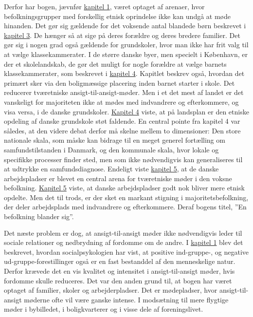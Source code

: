 \documentclass[
]{book}
\begin{document}
Derfor har bogen, jævnfør \hyperref[kap1]{kapitel 1}, været optaget af arenaer, hvor befolkningsgrupper med forskellig etnisk oprindelse ikke kan undgå at møde hinanden. Det gør sig gældende for det voksende antal blandede børn beskrevet i \hyperref[kap3]{kapitel 3}. De hænger så at sige på deres forældre og deres bredere familier. Det gør sig i nogen grad også gældende for grundskoler, hvor man ikke har frit valg til at vælge klassekammerater. I de større danske byer, men specielt i København, er der et skolelandskab, de gør det muligt for nogle forældre at vælge barnets klassekammerater, som beskrevet i \hyperref[kap4]{kapitel 4}. Kapitlet beskrev også, hvordan det primært sker via den boligmæssige placering inden barnet starter i skole. Det reducerer tværetniske ansigt-til-ansigt-møder. Men i et det mest af landet er det vanskeligt for majoriteten ikke at mødes med indvandrere og efterkommere, og visa versa, i de danske grundskoler. \hyperref[kap4]{Kapitel 4} viste, at på landsplan er den etniske opdeling af danske grundskole støt faldende. En central pointe fra kapitel 4 var således, at den videre debat derfor må skelne mellem to dimensioner: Den store nationale skala, som måske kan bidrage til en meget generel fortælling om samfundstilstanden i Danmark, og den kommunale skala, hvor lokale og specifikke processer finder sted, men som ikke nødvendigvis kan generaliseres til at udtrykke en samfundsdiagnose. Endeligt viste \hyperref[kap5]{kapitel 5}, at de danske arbejdspladser er blevet en central arena for tværetniske møder i den voksne befolkning. \href{kap5}{Kapitel 5} viste, at danske arbejdspladser godt nok bliver mere etnisk opdelte. Men det til trods, er der sket en markant stigning i majoritetsbefolkning, der deler arbejdsplads med indvandrere og efterkommere. Deraf bogens titel, ''En befolkning blander sig''.

Det næste problem er dog, at ansigt-til-ansigt møder ikke nødvendigvis leder til sociale relationer og nedbrydning af fordomme om de andre. I \hyperref[kap1]{kapitel 1} blev det beskrevet, hvordan socialpsykologien har vist, at positive ind-gruppe-, og negative ud-gruppe-forestillinger også er en fast bestanddel af den menneskelige natur. Derfor krævede det en vis kvalitet og intensitet i ansigt-til-ansigt møder, hvis fordomme skulle reduceres. Det var den anden grund til, at bogen har været optaget af familier, skoler og arbejderpladser. Det er mødepladser, hvor ansigt-til-ansigt møderne ofte vil være ganske intense. I modsætning til mere flygtige møder i bybilledet, i boligkvarterer og i visse dele af foreningslivet.
\end{document}
